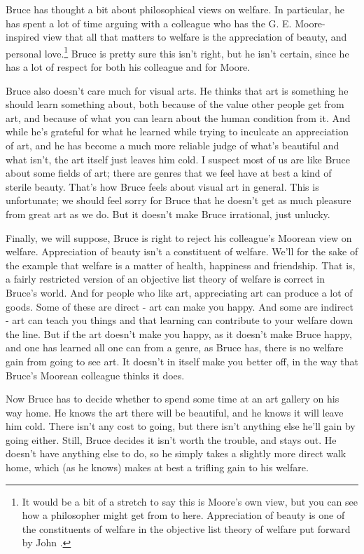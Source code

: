 \gls{Bruce} has thought a bit about philosophical views on welfare. In particular, he has spent a lot of time arguing with a colleague who has the G. E. Moore-inspired view that all that matters to welfare is the appreciation of beauty, and personal love.\footnote{It would be a bit of a stretch to say this is Moore's own view, but you can see how a philosopher might get from \citet{Moore1903} to here. Appreciation of beauty is one of the constituents of welfare in the objective list theory of welfare put forward by John \citet[87-8]{Finnis2011}.} \gls{Bruce} is pretty sure this isn't right, but he isn't certain, since he has a lot of respect for both his colleague and for Moore.

\gls{Bruce} also doesn't care much for visual arts. He thinks that art is something he should learn something about, both because of the value other people get from art, and because of what you can learn about the human condition from it. And while he's grateful for what he learned while trying to inculcate an appreciation of art, and he has become a much more reliable judge of what's beautiful and what isn't, the art itself just leaves him cold. I suspect most of us are like \gls{Bruce} about some fields of art; there are genres that we feel have at best a kind of sterile beauty. That's how \gls{Bruce} feels about visual art in general. This is unfortunate; we should feel sorry for \gls{Bruce} that he doesn't get as much pleasure from great art as we do. But it doesn't make \gls{Bruce} irrational, just unlucky.

Finally, we will suppose, \gls{Bruce} is right to reject his colleague's Moorean view on welfare. Appreciation of beauty isn't a constituent of welfare. We'll for the sake of the example that welfare is a matter of health, happiness and friendship. That is, a fairly restricted version of an objective list theory of welfare is correct in \gls{Bruce}'s world. And for people who like art, appreciating art can produce a lot of goods. Some of these are direct - art can make you happy. And some are indirect - art can teach you things and that learning can contribute to your welfare down the line. But if the art doesn't make you happy, as it doesn't make \gls{Bruce} happy, and one has learned all one can from a genre, as \gls{Bruce} has, there is no welfare gain from going to see art. It doesn't in itself make you better off, in the way that \gls{Bruce}'s Moorean colleague thinks it does.

Now \gls{Bruce} has to decide whether to spend some time at an art gallery on his way home. He knows the art there will be beautiful, and he knows it will leave him cold. There isn't any cost to going, but there isn't anything else he'll gain by going either. Still, \gls{Bruce} decides it isn't worth the trouble, and stays out. He doesn't have anything else to do, so he simply takes a slightly more direct walk home, which (as he knows) makes at best a trifling gain to his welfare.

